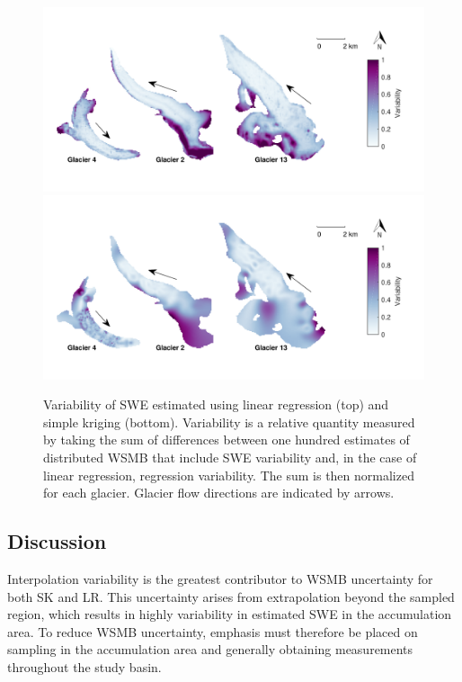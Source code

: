 \documentclass[12pt]{article}
\begin{document}
\begin{figure}
	\centering
	\includegraphics[width =\textwidth]{SpatialVar_LR.pdf}\\
	\includegraphics[width =\textwidth]{SpatialVar_SK.pdf}\\
	\caption{Variability of SWE estimated using linear regression (top) and simple kriging (bottom).	Variability is a relative quantity measured by taking the sum of differences between one hundred estimates of distributed WSMB that include SWE variability and, in the case of linear regression, regression variability. The sum is then normalized for each glacier. Glacier flow directions are indicated by arrows.}
	\label{fig:WSMBspatialvar}
\end{figure}


\subsection{Discussion}

Interpolation variability is the greatest contributor to WSMB uncertainty for both SK and LR. This uncertainty arises from extrapolation beyond the sampled region, which results in highly variability in estimated SWE in the accumulation area. To reduce WSMB uncertainty, emphasis must therefore be placed on sampling in the accumulation area and generally obtaining measurements throughout the study basin. 
\end{document}
